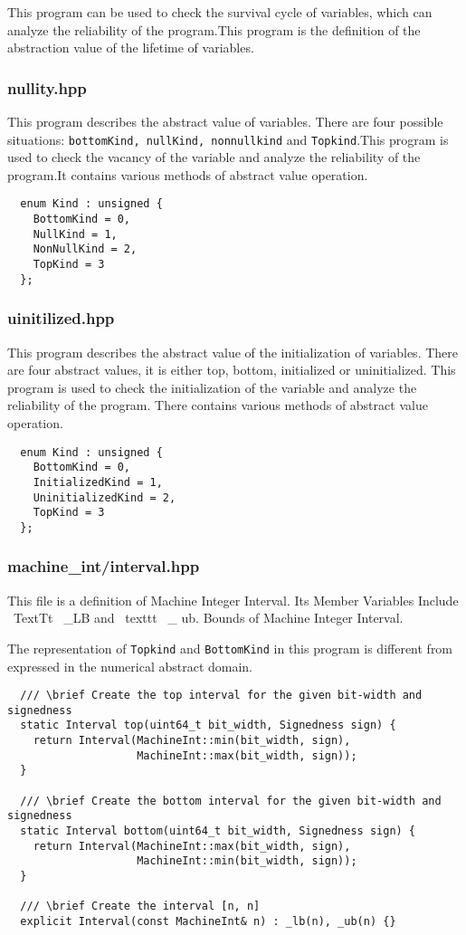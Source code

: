 \documentclass[12pt]{article}
\begin{document}
This program can be used to check the survival cycle of variables, which can analyze the reliability of the program.This program is the definition of the abstraction value of the lifetime of variables.

\subsubsection{nullity.hpp}
This program describes the abstract value of variables. There are four possible situations: \texttt {bottomKind, nullKind, nonnullkind} and \texttt {Topkind}.This program is used to check the vacancy of the variable and analyze the reliability of the program.It contains various methods of abstract value operation.
\begin{lstlisting}
  enum Kind : unsigned {
    BottomKind = 0,
    NullKind = 1,
    NonNullKind = 2,
    TopKind = 3
  };
\end{lstlisting}

\subsubsection{uinitilized.hpp}
This program describes the abstract value of the initialization of variables. There are four abstract values, it is either top, bottom, initialized or uninitialized. This program is used to check the initialization of the variable and analyze the reliability of the program. There contains various methods of abstract value operation.
\begin{lstlisting}
  enum Kind : unsigned {
    BottomKind = 0,
    InitializedKind = 1,
    UninitializedKind = 2,
    TopKind = 3
  };
\end{lstlisting}

\subsubsection{machine\_int/interval.hpp}
This file is a definition of Machine Integer Interval. Its Member Variables Include \ TextTt {\ _LB} and \ texttt {\ _ ub}. Bounds of Machine Integer Interval. 

The representation of \texttt{Topkind} and \texttt{BottomKind} in this program is different from expressed in the numerical abstract domain.

\begin{lstlisting}
  /// \brief Create the top interval for the given bit-width and signedness
  static Interval top(uint64_t bit_width, Signedness sign) {
    return Interval(MachineInt::min(bit_width, sign),
                    MachineInt::max(bit_width, sign));
  }

  /// \brief Create the bottom interval for the given bit-width and signedness
  static Interval bottom(uint64_t bit_width, Signedness sign) {
    return Interval(MachineInt::max(bit_width, sign),
                    MachineInt::min(bit_width, sign));
  }

  /// \brief Create the interval [n, n]
  explicit Interval(const MachineInt& n) : _lb(n), _ub(n) {}
\end{lstlisting}
\end{document}
